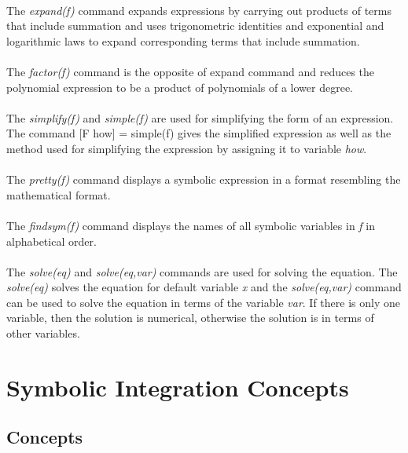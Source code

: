 \documentclass[]{article}
\begin{document}
\paragraph{}
The \emph{expand(f)} command expands expressions by carrying out products of terms that include summation and uses trigonometric identities and exponential and logarithmic laws to expand corresponding terms that include summation.
\paragraph{}
The \emph{factor(f)} command is the opposite of expand command and reduces the polynomial expression to be a product of polynomials of a lower degree.
\paragraph{}
The \emph{simplify(f)} and \emph{simple(f)} are used for simplifying the form of an expression. The command [F how] = simple(f) gives the simplified expression as well as the method used for simplifying the expression by assigning it to variable \emph{how}.
\paragraph{}
The \emph{pretty(f)} command displays a symbolic expression in a format resembling the mathematical format.
\paragraph{}
The \emph{findsym(f)} command displays the names of all symbolic variables in \emph{f} in alphabetical order.  
\paragraph{}
The \emph{solve(eq)} and \emph{solve(eq,var)} commands are used for solving the equation. The \emph{solve(eq)}  solves the equation for default variable \emph{x} and the \emph{solve(eq,var)} command can be used to solve the equation in terms of the variable \emph{var}. If there is only one variable, then the solution is numerical, otherwise the solution is in terms of other variables.

\section{Symbolic Integration Concepts}
\subsection{Concepts}
\end{document}
